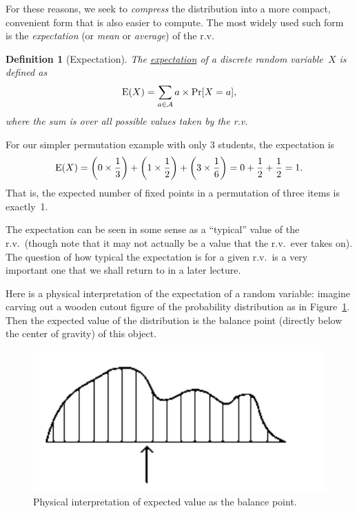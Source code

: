 \documentclass[11pt]{article}
\def\ul#1{\underline{#1}}
\def\Ex#1{{\rm E}(#1)}
\def\Aset{{\cal A}}
\newcounter{thm}
\newtheorem{definition}{Definition}[thm]
\begin{document}
For these reasons, we seek to {\it compress\/} the distribution into
a more compact, convenient form that is also easier to compute.
The most widely used such form is the {\it expectation\/}
(or {\it mean\/} or {\it average\/}) of the r.v.
\begin{definition}[Expectation]\label{Def:Expectation}
The \ul{expectation} of a discrete random variable~$X$ is
defined as $$
   \Ex{X}=\sum_{a\in\Aset} a\times\Pr[X=a], $$
where the sum is over all possible values taken by the r.v.
\end{definition}

For our simpler permutation example with only 3 students, the expectation is $$
   \Ex{X}=\left( 0\times{1\over 3}\right) +
          \left( 1\times{1\over 2}\right) +
          \left( 3\times{1\over 6}\right) =
          0+{1\over 2}+{1\over 2} = 1.  $$
That is, the expected number of fixed points in a permutation of three
items is exactly~1.

The expectation can be seen in some sense as a ``typical'' value
of the r.v.\ (though note that it may not actually be a value
that the r.v.\ ever takes on).  The question of how typical the
expectation is for a given r.v.\ is a very important one that we
shall return to in a later lecture.

Here is a physical interpretation of the expectation of a random variable:
imagine carving out a wooden cutout figure of the probability distribution
as in Figure~\ref{fig:gravity}. Then the expected value of the distribution is the balance point
(directly below the center of gravity) of this object. 

\begin{figure}[h!]
\centering
\includegraphics[scale=0.6]{gravity.pdf}
\caption{Physical interpretation of expected value as the balance point.}
\label{fig:gravity}
\end{figure}
\end{document}
